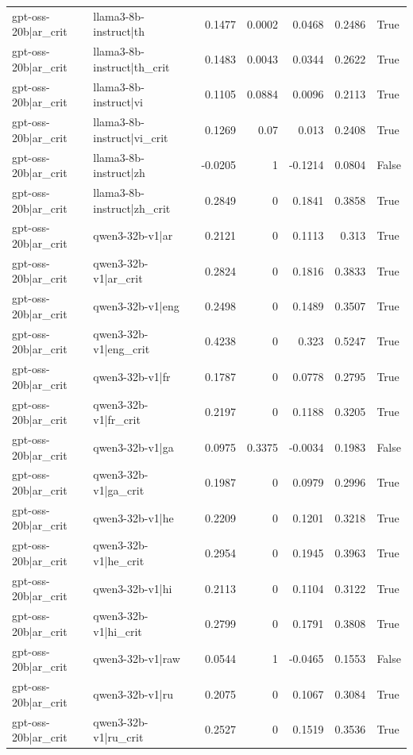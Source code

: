 \begin{table}
\begin{tabular}{l l r r r r l}
gpt-oss-20b|ar_crit & llama3-8b-instruct|th & 0.1477 & 0.0002 & 0.0468 & 0.2486 & True \\
gpt-oss-20b|ar_crit & llama3-8b-instruct|th_crit & 0.1483 & 0.0043 & 0.0344 & 0.2622 & True \\
gpt-oss-20b|ar_crit & llama3-8b-instruct|vi & 0.1105 & 0.0884 & 0.0096 & 0.2113 & True \\
gpt-oss-20b|ar_crit & llama3-8b-instruct|vi_crit & 0.1269 & 0.07 & 0.013 & 0.2408 & True \\
gpt-oss-20b|ar_crit & llama3-8b-instruct|zh & -0.0205 & 1 & -0.1214 & 0.0804 & False \\
gpt-oss-20b|ar_crit & llama3-8b-instruct|zh_crit & 0.2849 & 0 & 0.1841 & 0.3858 & True \\
gpt-oss-20b|ar_crit & qwen3-32b-v1|ar & 0.2121 & 0 & 0.1113 & 0.313 & True \\
gpt-oss-20b|ar_crit & qwen3-32b-v1|ar_crit & 0.2824 & 0 & 0.1816 & 0.3833 & True \\
gpt-oss-20b|ar_crit & qwen3-32b-v1|eng & 0.2498 & 0 & 0.1489 & 0.3507 & True \\
gpt-oss-20b|ar_crit & qwen3-32b-v1|eng_crit & 0.4238 & 0 & 0.323 & 0.5247 & True \\
gpt-oss-20b|ar_crit & qwen3-32b-v1|fr & 0.1787 & 0 & 0.0778 & 0.2795 & True \\
gpt-oss-20b|ar_crit & qwen3-32b-v1|fr_crit & 0.2197 & 0 & 0.1188 & 0.3205 & True \\
gpt-oss-20b|ar_crit & qwen3-32b-v1|ga & 0.0975 & 0.3375 & -0.0034 & 0.1983 & False \\
gpt-oss-20b|ar_crit & qwen3-32b-v1|ga_crit & 0.1987 & 0 & 0.0979 & 0.2996 & True \\
gpt-oss-20b|ar_crit & qwen3-32b-v1|he & 0.2209 & 0 & 0.1201 & 0.3218 & True \\
gpt-oss-20b|ar_crit & qwen3-32b-v1|he_crit & 0.2954 & 0 & 0.1945 & 0.3963 & True \\
gpt-oss-20b|ar_crit & qwen3-32b-v1|hi & 0.2113 & 0 & 0.1104 & 0.3122 & True \\
gpt-oss-20b|ar_crit & qwen3-32b-v1|hi_crit & 0.2799 & 0 & 0.1791 & 0.3808 & True \\
gpt-oss-20b|ar_crit & qwen3-32b-v1|raw & 0.0544 & 1 & -0.0465 & 0.1553 & False \\
gpt-oss-20b|ar_crit & qwen3-32b-v1|ru & 0.2075 & 0 & 0.1067 & 0.3084 & True \\
gpt-oss-20b|ar_crit & qwen3-32b-v1|ru_crit & 0.2527 & 0 & 0.1519 & 0.3536 & True \\

\end{tabular}
\end{table}

